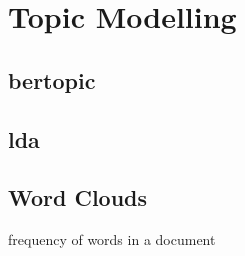 \section{Topic Modelling}\label{sec:topic-modelling}

\subsection{\ac{bertopic}}\label{subsec:bertopic}

\subsection{\ac{lda}}\label{subsec:latent-dirichlet-allocation}
\cite{clusteringDocs2020}

\subsection{Word Clouds}\label{subsec:word-clouds}
frequency of words in a document